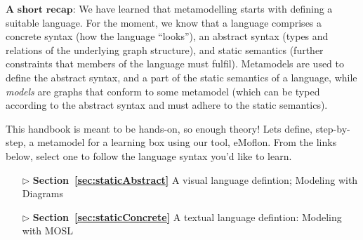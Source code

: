 $\textbf{A short recap:}$ We have learned that metamodelling starts with defining a suitable language.
For the moment, we know that a language comprises a concrete syntax (how the language ``looks''),  an abstract syntax (types and relations of the underlying
graph structure), and static semantics (further constraints that members of the language must fulfil). Metamodels are used to define the abstract syntax, and a
part of the static semantics of a language, while \emph{models} are graphs that conform to some  metamodel (which can be typed according
to the abstract syntax and must adhere to the static semantics).

This handbook is meant to be hands-on, so enough theory! Lets define, step-by-step, a metamodel for a learning box using our tool, eMoflon. From the links
below, select one to follow the language syntax you'd like to learn.

\vspace{1cm}

\begin{itemize}
  \item[$\triangleright$] {\bf Section~\ref{sec:staticAbstract}} A visual language defintion; Modeling with Diagrams
  \item[$\triangleright$] {\bf Section~\ref{sec:staticConcrete}} A textual language defintion: Modeling with MOSL
\end{itemize}